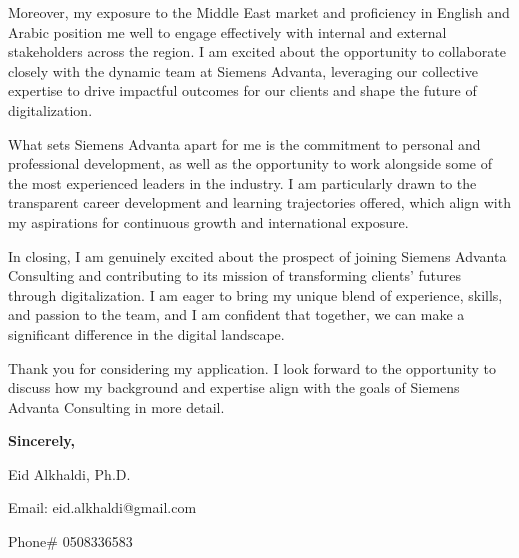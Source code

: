 \documentclass[11pt]{article}
\begin{document}
Moreover, my exposure to the Middle East market and proficiency in English and Arabic position me well to engage effectively with internal and external stakeholders across the region. I am excited about the opportunity to collaborate closely with the dynamic team at Siemens Advanta, leveraging our collective expertise to drive impactful outcomes for our clients and shape the future of digitalization.

What sets Siemens Advanta apart for me is the commitment to personal and professional development, as well as the opportunity to work alongside some of the most experienced leaders in the industry. I am particularly drawn to the transparent career development and learning trajectories offered, which align with my aspirations for continuous growth and international exposure.

In closing, I am genuinely excited about the prospect of joining Siemens Advanta Consulting and contributing to its mission of transforming clients' futures through digitalization. I am eager to bring my unique blend of experience, skills, and passion to the team, and I am confident that together, we can make a significant difference in the digital landscape.

Thank you for considering my application. I look forward to the opportunity to discuss how my background and expertise align with the goals of Siemens Advanta Consulting in more detail.

\textbf{Sincerely,}

Eid Alkhaldi, Ph.D. 

Email: eid.alkhaldi@gmail.com

Phone\# 0508336583
\end{document}
